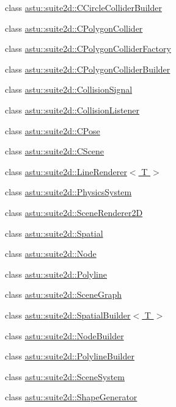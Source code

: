\begin{DoxyCompactItemize}
class \hyperlink{classastu_1_1suite2d_1_1CCircleColliderBuilder}{astu\+::suite2d\+::\+C\+Circle\+Collider\+Builder}
\item 
class \hyperlink{classastu_1_1suite2d_1_1CPolygonCollider}{astu\+::suite2d\+::\+C\+Polygon\+Collider}
\item 
class \hyperlink{classastu_1_1suite2d_1_1CPolygonColliderFactory}{astu\+::suite2d\+::\+C\+Polygon\+Collider\+Factory}
\item 
class \hyperlink{classastu_1_1suite2d_1_1CPolygonColliderBuilder}{astu\+::suite2d\+::\+C\+Polygon\+Collider\+Builder}
\item 
class \hyperlink{classastu_1_1suite2d_1_1CollisionSignal}{astu\+::suite2d\+::\+Collision\+Signal}
\item 
class \hyperlink{classastu_1_1suite2d_1_1CollisionListener}{astu\+::suite2d\+::\+Collision\+Listener}
\item 
class \hyperlink{classastu_1_1suite2d_1_1CPose}{astu\+::suite2d\+::\+C\+Pose}
\item 
class \hyperlink{classastu_1_1suite2d_1_1CScene}{astu\+::suite2d\+::\+C\+Scene}
\item 
class \hyperlink{classastu_1_1suite2d_1_1LineRenderer}{astu\+::suite2d\+::\+Line\+Renderer$<$ T $>$}
\item 
class \hyperlink{classastu_1_1suite2d_1_1PhysicsSystem}{astu\+::suite2d\+::\+Physics\+System}
\item 
class \hyperlink{classastu_1_1suite2d_1_1SceneRenderer2D}{astu\+::suite2d\+::\+Scene\+Renderer2D}
\item 
class \hyperlink{classastu_1_1suite2d_1_1Spatial}{astu\+::suite2d\+::\+Spatial}
\item 
class \hyperlink{classastu_1_1suite2d_1_1Node}{astu\+::suite2d\+::\+Node}
\item 
class \hyperlink{classastu_1_1suite2d_1_1Polyline}{astu\+::suite2d\+::\+Polyline}
\item 
class \hyperlink{classastu_1_1suite2d_1_1SceneGraph}{astu\+::suite2d\+::\+Scene\+Graph}
\item 
class \hyperlink{classastu_1_1suite2d_1_1SpatialBuilder}{astu\+::suite2d\+::\+Spatial\+Builder$<$ T $>$}
\item 
class \hyperlink{classastu_1_1suite2d_1_1NodeBuilder}{astu\+::suite2d\+::\+Node\+Builder}
\item 
class \hyperlink{classastu_1_1suite2d_1_1PolylineBuilder}{astu\+::suite2d\+::\+Polyline\+Builder}
\item 
class \hyperlink{classastu_1_1suite2d_1_1SceneSystem}{astu\+::suite2d\+::\+Scene\+System}
\item 
class \hyperlink{classastu_1_1suite2d_1_1ShapeGenerator}{astu\+::suite2d\+::\+Shape\+Generator}
\end{DoxyCompactItemize}
